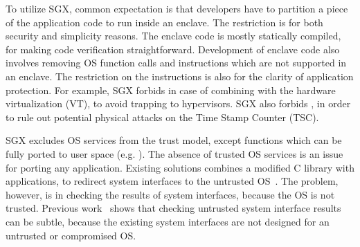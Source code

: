 
To utilize SGX, common expectation is that developers have to partition a piece of the application code to run inside an enclave.
The restriction is for both security and simplicity reasons.
The enclave code is mostly statically compiled, for making code verification straightforward.
Development of enclave code also involves removing OS function calls and instructions which are not supported in an enclave.
The restriction on the instructions is also for the clarity of application protection.
For example,
SGX forbids  in case of combining with the hardware virtualization (VT),
to avoid trapping to hypervisors.
SGX also forbids , in order to rule out potential physical attacks on the Time Stamp Counter (TSC). 



SGX excludes OS services from the trust model, except functions which can be fully ported to user space (e.g. ).
The absence of trusted OS services is an issue for porting any application.
Existing solutions combines a modified C library with applications, to redirect system interfaces
to the untrusted OS~\cite{osdi16scone,shinde17panoply}.
The problem, however, is in checking the results of system interfaces, because the OS is not trusted. %
Previous work~\cite{checkoway13iago} shows that
checking untrusted system interface results can be subtle, because the existing system interfaces are not designed for an untrusted or compromised OS.


